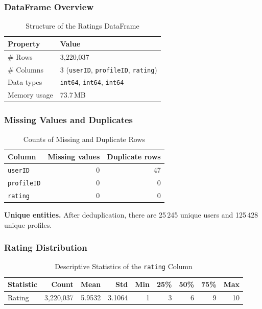 \subsubsection*{DataFrame Overview}
\begin{table}[ht]
\centering
\caption{Structure of the Ratings DataFrame}
\label{tab:df-overview}
\begin{tabular}{@{}ll@{}}
\toprule
Property        & Value                                             \\ 
\midrule
\# Rows         & 3{,}220{,}037                                     \\
\# Columns      & 3 (\texttt{userID}, \texttt{profileID}, \texttt{rating})    \\
Data types      & \texttt{int64}, \texttt{int64}, \texttt{int64}   \\
Memory usage    & 73.7\,MB                                          \\
\bottomrule
\end{tabular}
\end{table}

\subsubsection*{Missing Values and Duplicates}
\begin{table}[ht]
\centering
\caption{Counts of Missing and Duplicate Rows}
\label{tab:missing-dup}
\begin{tabular}{@{}lrr@{}}
\toprule
Column        & Missing values & Duplicate rows \\ 
\midrule
\texttt{userID}    & 0              & 47   \\
\texttt{profileID} & 0              & 0    \\
\texttt{rating}    & 0              & 0    \\
\bottomrule
\end{tabular}
\end{table}

\noindent\textbf{Unique entities.} After deduplication, there are 25\,245 unique users and 125\,428 unique profiles.

\subsubsection*{Rating Distribution}

\begin{table}[ht]
    \centering
    \caption{Descriptive Statistics of the \texttt{rating} Column}
    \label{tab:rating-stats}
    \begin{tabular}{@{}lrrrrrrrr@{}}
    \toprule
    Statistic   & Count        & Mean   & Std    & Min & 25\% & 50\% & 75\% & Max \\ 
    \midrule
    Rating      & 3{,}220{,}037 & 5.9532 & 3.1064 & 1  & 3    & 6  & 9    & 10  \\
    \bottomrule
    \end{tabular}
\end{table}


